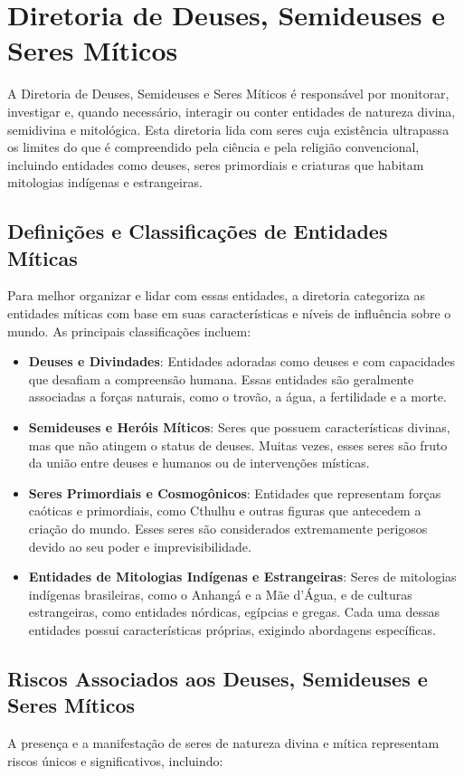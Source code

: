 \chapter{Diretoria de Deuses, Semideuses e Seres Míticos}

A Diretoria de Deuses, Semideuses e Seres Míticos é responsável por monitorar, investigar e, quando necessário, interagir ou conter entidades de natureza divina, semidivina e mitológica. Esta diretoria lida com seres cuja existência ultrapassa os limites do que é compreendido pela ciência e pela religião convencional, incluindo entidades como deuses, seres primordiais e criaturas que habitam mitologias indígenas e estrangeiras.

\section{Definições e Classificações de Entidades Míticas}
Para melhor organizar e lidar com essas entidades, a diretoria categoriza as entidades míticas com base em suas características e níveis de influência sobre o mundo. As principais classificações incluem:

\begin{itemize}
    \item \textbf{Deuses e Divindades}: Entidades adoradas como deuses e com capacidades que desafiam a compreensão humana. Essas entidades são geralmente associadas a forças naturais, como o trovão, a água, a fertilidade e a morte.
    \item \textbf{Semideuses e Heróis Míticos}: Seres que possuem características divinas, mas que não atingem o status de deuses. Muitas vezes, esses seres são fruto da união entre deuses e humanos ou de intervenções místicas.
    \item \textbf{Seres Primordiais e Cosmogônicos}: Entidades que representam forças caóticas e primordiais, como Cthulhu e outras figuras que antecedem a criação do mundo. Esses seres são considerados extremamente perigosos devido ao seu poder e imprevisibilidade.
    \item \textbf{Entidades de Mitologias Indígenas e Estrangeiras}: Seres de mitologias indígenas brasileiras, como o Anhangá e a Mãe d'Água, e de culturas estrangeiras, como entidades nórdicas, egípcias e gregas. Cada uma dessas entidades possui características próprias, exigindo abordagens específicas.
\end{itemize}

\section{Riscos Associados aos Deuses, Semideuses e Seres Míticos}
A presença e a manifestação de seres de natureza divina e mítica representam riscos únicos e significativos, incluindo:

